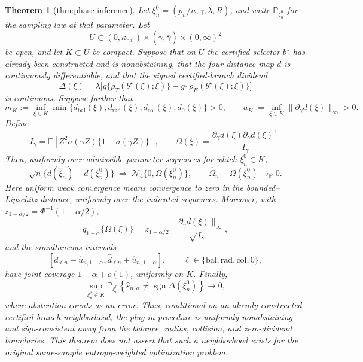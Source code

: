 \documentclass{article}
\newtheorem{theorem}{Theorem}
\begin{document}
\begin{theorem}[thm:phase-inference]\label{thm:phase-inference}
Let \(\xi_n^0=(p_n/n,\gamma,\lambda,R)\), and write \(\mathbb P_{\xi_n^0}\) for the sampling law at that parameter.  Let
\[
 U\subset (0,\kappa_{\mathrm{bal}})\times
 (\underline\gamma,\overline\gamma)\times(0,\infty)^2
\]
be open, and let \(K\subset U\) be compact.  Suppose that on \(U\) the certified selector \(b^\star\) has already been constructed and is nonabstaining, that the four-distance map \(d\) is continuously differentiable, and that the signed certified-branch dividend
\[
 \Delta(\xi)=\lambda\bigl[g\{\rho_T(b^\star(\xi);\xi)\}
                    -g\{\rho_E(b^\star(\xi);\xi)\}\bigr]
\]
is continuous.  Suppose further that
\[
 m_K:=\inf_{\xi\in K}
 \min\{d_{\mathrm{bal}}(\xi),d_{\mathrm{rad}}(\xi),
        d_{\mathrm{col}}(\xi),d_0(\xi)\}>0,
 \qquad
 a_K:=\inf_{\xi\in K}\|\partial_\gamma d(\xi)\|_\infty>0.
\]
Define
\[
 I_\gamma=\mathbb E\!\left[Z^2\sigma(\gamma Z)
                       \{1-\sigma(\gamma Z)\}\right],
 \qquad
 \Omega(\xi)=
 \frac{\partial_\gamma d(\xi)\partial_\gamma d(\xi)^\top}{I_\gamma}.
\]
Then, uniformly over admissible parameter sequences for which \(\xi_n^0\in K\),
\[
 \sqrt n\{d(\widehat\xi_n)-d(\xi_n^0)\}
 \ \Rightarrow\ \mathcal N_4\{0,\Omega(\xi_n^0)\},
 \qquad
 \widehat\Omega_n-\Omega(\xi_n^0)\to_{\mathbb P}0.
\]
Here uniform weak convergence means convergence to zero in the bounded--Lipschitz distance, uniformly over the indicated sequences.  Moreover, with \(z_{1-\alpha/2}=\Phi^{-1}(1-\alpha/2)\),
\[
 q_{1-\alpha}\{\Omega(\xi)\}
 =z_{1-\alpha/2}\frac{\|\partial_\gamma d(\xi)\|_\infty}{\sqrt{I_\gamma}},
\]
and the simultaneous intervals
\[
 [\widehat d_{\ell n}-\widehat u_{n,1-\alpha},
   \widehat d_{\ell n}+\widehat u_{n,1-\alpha}],
 \qquad \ell\in\{\mathrm{bal},\mathrm{rad},\mathrm{col},0\},
\]
have joint coverage \(1-\alpha+o(1)\), uniformly on \(K\).  Finally,
\[
 \sup_{\xi_n^0\in K}
 \mathbb P_{\xi_n^0}\!\left\{
   \widehat s_{n,\alpha}\ne\operatorname{sgn}\Delta(\xi_n^0)
 \right\}\longrightarrow0,
\]
where abstention counts as an error.  Thus, conditional on an already constructed certified branch neighborhood, the plug-in procedure is uniformly nonabstaining and sign-consistent away from the balance, radius, collision, and zero-dividend boundaries.  This theorem does not assert that such a neighborhood exists for the original same-sample entropy-weighted optimization problem.
\end{theorem}
\end{document}
